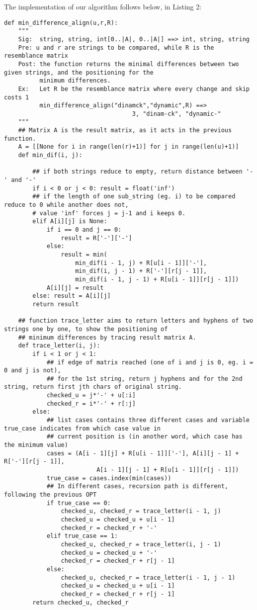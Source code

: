 \documentclass[a4paper,11pt]{article}
\begin{document}
The implementation of our algorithm follows below, in Listing 2:\\
\begin{lstlisting}[caption={Returning positioning},label={2nd1_2}]
def min_difference_align(u,r,R):
    """
    Sig:  string, string, int[0..|A|, 0..|A|] ==> int, string, string
    Pre: u and r are strings to be compared, while R is the resemblance matrix
    Post: the function returns the minimal differences between two given strings, and the positioning for the
          minimum differences.
    Ex:   Let R be the resemblance matrix where every change and skip costs 1
          min_difference_align("dinamck","dynamic",R) ==>
                                    3, "dinam-ck", "dynamic-"
    """
    ## Matrix A is the result matrix, as it acts in the previous function.
    A = [[None for i in range(len(r)+1)] for j in range(len(u)+1)]
    def min_dif(i, j):

        ## if both strings reduce to empty, return distance between '-' and '-'
        if i < 0 or j < 0: result = float('inf')
        ## if the length of one sub_string (eg. i) to be compared reduce to 0 while another does not,
        # value 'inf' forces j = j-1 and i keeps 0.
        elif A[i][j] is None:
            if i == 0 and j == 0:
                result = R['-']['-']
            else:
                result = min(
                    min_dif(i - 1, j) + R[u[i - 1]]['-'],
                    min_dif(i, j - 1) + R['-'][r[j - 1]],
                    min_dif(i - 1, j - 1) + R[u[i - 1]][r[j - 1]])
            A[i][j] = result
        else: result = A[i][j]
        return result

    ## function trace_letter aims to return letters and hyphens of two strings one by one, to show the positioning of
    ## minimum differences by tracing result matrix A.
    def trace_letter(i, j):
        if i < 1 or j < 1:
            ## if edge of matrix reached (one of i and j is 0, eg. i = 0 and j is not),
            ## for the 1st string, return j hyphens and for the 2nd string, return first jth chars of original string.
            checked_u = j*'-' + u[:i]
            checked_r = i*'-' + r[:j]
        else:
            ## list cases contains three different cases and variable true_case indicates from which case value in
            ## current position is (in another word, which case has the minimum value)
            cases = (A[i - 1][j] + R[u[i - 1]]['-'], A[i][j - 1] + R['-'][r[j - 1]],
                          A[i - 1][j - 1] + R[u[i - 1]][r[j - 1]])
            true_case = cases.index(min(cases))
            ## In different cases, recursion path is different, following the previous OPT
            if true_case == 0:
                checked_u, checked_r = trace_letter(i - 1, j)
                checked_u = checked_u + u[i - 1]
                checked_r = checked_r + '-'
            elif true_case == 1:
                checked_u, checked_r = trace_letter(i, j - 1)
                checked_u = checked_u + '-'
                checked_r = checked_r + r[j - 1]
            else:
                checked_u, checked_r = trace_letter(i - 1, j - 1)
                checked_u = checked_u + u[i - 1]
                checked_r = checked_r + r[j - 1]
        return checked_u, checked_r


\end{lstlisting}
\end{document}
